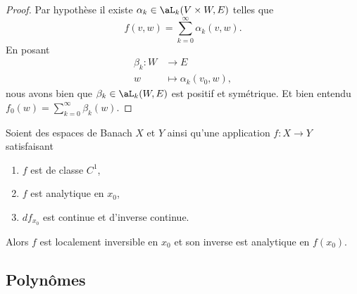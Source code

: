 \begin{proof}
	Par hypothèse il existe \( \alpha_k\in\aL_k(V\times W,E) \) telles que
	\begin{equation}
		f(v,w)=\sum_{k=0}^{\infty}\alpha_k(v,w).
	\end{equation}
	En posant
	\begin{equation}
		\begin{aligned}
			\beta_k\colon W & \to E                    \\
			w               & \mapsto \alpha_k(v_0,w),
		\end{aligned}
	\end{equation}
	nous avons bien que \( \beta_k\in\aL_k(W,E)\) est positif et symétrique. Et bien entendu \( f_0(w)=\sum_{k=0}^{\infty}\beta_k(w)\).
\end{proof}

\begin{theorem}	\label{THOooSZHVooKSEmuI}
	Soient des espaces de Banach \( X\) et \( Y\) ainsi qu'une application \(f \colon X\to Y  \) satisfaisant
	\begin{enumerate}
		\item
		      \( f\) est de classe \( C^1\),
		\item
		      \( f\) est analytique en \( x_0\),
		\item
		      \( df_{x_0}\) est continue  et d'inverse continue.
	\end{enumerate}
	Alors \( f\) est localement inversible en \( x_0\) et son inverse est analytique en \( f(x_0)\).
\end{theorem}

\subsection{Polynômes}

